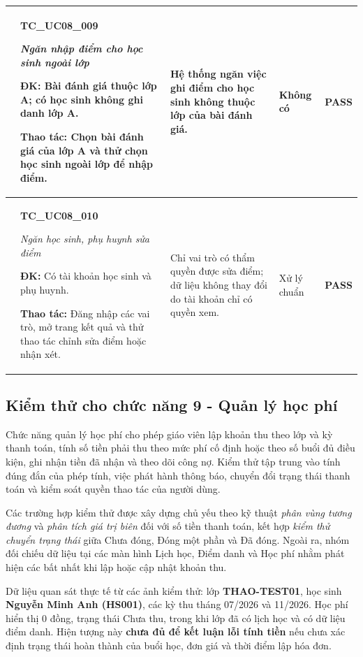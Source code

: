 \begin{longtable}{|>{\centering\arraybackslash}p{0.8cm}|>{\raggedright\arraybackslash}p{4.6cm}|>{\raggedright\arraybackslash}p{3.8cm}|>{\raggedright\arraybackslash}p{3.8cm}|>{\centering\arraybackslash}p{1.5cm}|}
9 & \textbf{TC\_UC08\_009}\par \textit{Ngăn nhập điểm cho học sinh ngoài lớp}\par \textbf{ĐK:} Bài đánh giá thuộc lớp A; có học sinh không ghi danh lớp A.\par \textbf{Thao tác:} Chọn bài đánh giá của lớp A và thử chọn học sinh ngoài lớp để nhập điểm. & Hệ thống ngăn việc ghi điểm cho học sinh không thuộc lớp của bài đánh giá. & Không có & \textbf{PASS} \\ \hline
10 & \textbf{TC\_UC08\_010}\par \textit{Ngăn học sinh, phụ huynh sửa điểm}\par \textbf{ĐK:} Có tài khoản học sinh và phụ huynh.\par \textbf{Thao tác:} Đăng nhập các vai trò, mở trang kết quả và thử thao tác chỉnh sửa điểm hoặc nhận xét. & Chỉ vai trò có thẩm quyền được sửa điểm; dữ liệu không thay đổi do tài khoản chỉ có quyền xem. & Xử lý chuẩn & \textbf{PASS} \\ \hline
\end{longtable}


\subsection{Kiểm thử cho chức năng 9 - Quản lý học phí}
\label{subsec:test-uc09}

Chức năng quản lý học phí cho phép giáo viên lập khoản thu theo lớp và kỳ thanh toán, tính số tiền phải thu theo mức phí cố định hoặc theo số buổi đủ điều kiện, ghi nhận tiền đã nhận và theo dõi công nợ. Kiểm thử tập trung vào tính đúng đắn của phép tính, việc phát hành thông báo, chuyển đổi trạng thái thanh toán và kiểm soát quyền thao tác của người dùng.

Các trường hợp kiểm thử được xây dựng chủ yếu theo kỹ thuật \textit{phân vùng tương đương} và \textit{phân tích giá trị biên} đối với số tiền thanh toán, kết hợp \textit{kiểm thử chuyển trạng thái} giữa Chưa đóng, Đóng một phần và Đã đóng. Ngoài ra, nhóm đối chiếu dữ liệu tại các màn hình Lịch học, Điểm danh và Học phí nhằm phát hiện các bất nhất khi lập hoặc cập nhật khoản thu.

Dữ liệu quan sát thực tế từ các ảnh kiểm thử: lớp \textbf{THAO-TEST01}, học sinh \textbf{Nguyễn Minh Anh (HS001)}, các kỳ thu tháng 07/2026 và 11/2026. Học phí hiển thị 0 đồng, trạng thái Chưa thu, trong khi lớp đã có lịch học và có dữ liệu điểm danh. Hiện tượng này \textbf{chưa đủ để kết luận lỗi tính tiền} nếu chưa xác định trạng thái hoàn thành của buổi học, đơn giá và thời điểm lập hóa đơn.

